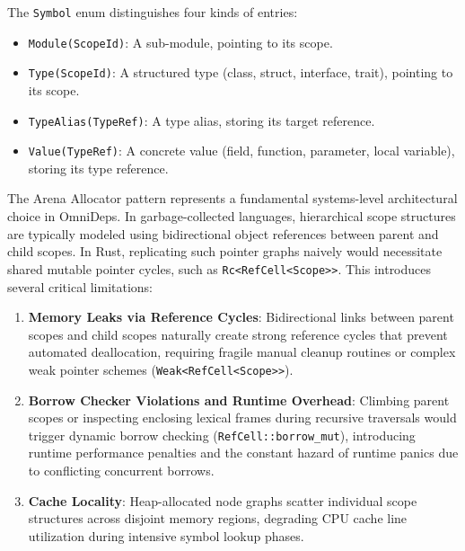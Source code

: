 The \texttt{Symbol} enum distinguishes four kinds of entries:
\begin{itemize}
  \item \texttt{Module(ScopeId)}: A sub-module, pointing to its scope.
  \item \texttt{Type(ScopeId)}: A structured type (class, struct,
    interface, trait), pointing to its scope.
  \item \texttt{TypeAlias(TypeRef)}: A type alias, storing its target reference.
  \item \texttt{Value(TypeRef)}: A concrete value (field, function,
    parameter, local variable), storing its type reference.
\end{itemize}

The Arena Allocator pattern represents a fundamental systems-level
architectural choice
in OmniDeps. In garbage-collected languages, hierarchical scope
structures are typically modeled
using bidirectional object references between parent and child
scopes. In Rust, replicating
such pointer graphs naively would necessitate shared mutable pointer
cycles, such as
\texttt{Rc<RefCell<Scope>>}. This introduces several critical limitations:
\begin{enumerate}
  \item \textbf{Memory Leaks via Reference Cycles}: Bidirectional
    links between parent scopes
    and child scopes naturally create strong reference cycles that
    prevent automated deallocation,
    requiring fragile manual cleanup routines or complex weak pointer
    schemes (\texttt{Weak<RefCell<Scope>>}).
  \item \textbf{Borrow Checker Violations and Runtime Overhead}:
    Climbing parent scopes
    or inspecting enclosing lexical frames during recursive
    traversals would trigger dynamic borrow
    checking (\texttt{RefCell::borrow\_mut}), introducing runtime
    performance penalties and the
    constant hazard of runtime panics due to conflicting concurrent borrows.
  \item \textbf{Cache Locality}: Heap-allocated node graphs scatter
    individual scope structures across
    disjoint memory regions, degrading CPU cache line utilization
    during intensive symbol lookup phases.
\end{enumerate}

